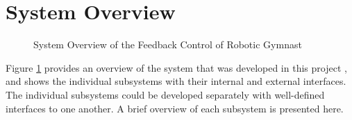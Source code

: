 \section{System Overview}
\label{sec:system_overview}
\begin{figure}[h]
	\centering
	
	\caption{System Overview of the Feedback Control of Robotic Gymnast}
	\label{fig:system_overview}
\end{figure}


Figure \ref{fig:system_overview}  provides an overview of the system that was developed in this project , and shows the individual subsystems with their internal and external interfaces. The individual subsystems could be developed separately with well-defined interfaces to one another. A brief overview of each subsystem is presented here.\\

